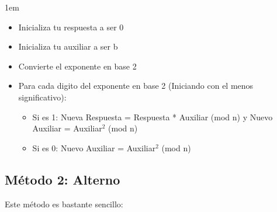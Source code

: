 \documentclass[12pt, fleqn]{report}                             %
\newenvironment{SmallIndentation}[1][0.75em]                    %
    {\begin{adjustwidth}{#1}{}\begin{footnotesize}}                 %
    {\end{footnotesize}\end{adjustwidth}}                           %
\begin{document}
            \begin{SmallIndentation}[1em]
                
                \begin{itemize}
                    \item   Inicializa tu respuesta a ser 0
                    \item   Inicializa tu auxiliar a ser b
                    \item   Convierte el exponente en base 2

                    \item Para cada digito del exponente en base 2 (Iniciando con
                          el menos significativo):
                        
                        \begin{itemize}
                            \item Si es 1:
                                    Nueva Respuesta = Respuesta * Auxiliar (mod n) y Nuevo Auxiliar = Auxiliar$^2$ (mod n)
                            \item Si es 0:
                                    Nuevo Auxiliar = Auxiliar$^2$ (mod n)
                        \end{itemize}
                \end{itemize}

            \end{SmallIndentation}


        \clearpage
        \subsection*{Método 2: Alterno}

            Este método es bastante sencillo:
\end{document}
